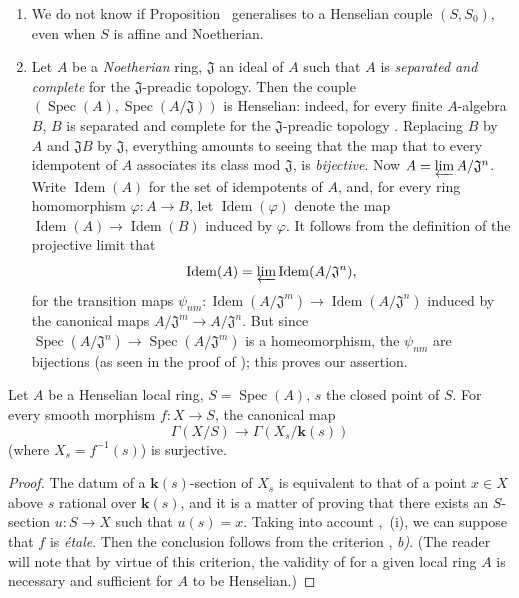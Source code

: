 \begin{remarks}[18.5.16]
\label{IV.18.5.16}
\begin{enumerate}
  \item[(i)] We do not know if Proposition~ generalises to a Henselian couple $(S,S_0)$, even when $S$ is affine and Noetherian.
  \item[(ii)] Let $A$ be a \emph{Noetherian} ring, $\mathfrak{J}$ an ideal of $A$ such that $A$ is \emph{separated and complete} for the $\mathfrak{J}$-preadic topology.
Then the couple $(\operatorname{Spec}(A),\operatorname{Spec}(A/\mathfrak{J}))$ is Henselian:
indeed, for every finite $A$-algebra $B$, $B$ is separated and complete for the $\mathfrak{J}$-preadic topology .
Replacing $B$ by $A$ and $\mathfrak{J}B$ by $\mathfrak{J}$, everything amounts to seeing that the map that to every idempotent of $A$ associates its class mod $\mathfrak{J}$, is \emph{bijective}.
Now $A=\varprojlim A/\mathfrak{J}^n$.
Write $\operatorname{Idem}(A)$ for the set of idempotents of $A$, and, for every ring homomorphism $\varphi:A\to B$, let $\operatorname{Idem}(\varphi)$ denote the map $\operatorname{Idem}(A)\to\operatorname{Idem}(B)$ induced by $\varphi$.
It follows from the definition of the projective limit that
\[
\operatorname{Idem}(A)=\varprojlim\operatorname{Idem}(A/\mathfrak{J}^n),
\]
for the transition maps $\psi_{nm}:\operatorname{Idem}(A/\mathfrak{J}^m)\to\operatorname{Idem}(A/\mathfrak{J}^n)$ induced by the canonical maps $A/\mathfrak{J}^m\to A/\mathfrak{J}^n$.
But since $\operatorname{Spec}(A/\mathfrak{J}^n)\to\operatorname{Spec}(A/\mathfrak{J}^m)$ is a homeomorphism, the $\psi_{nm}$ are bijections (as seen in the proof of );
this proves our assertion.
\end{enumerate}
\end{remarks}

\begin{theorem}[18.5.17]
\label{IV.18.5.17}
Let $A$ be a Henselian local ring, $S=\operatorname{Spec}(A)$, $s$ the closed point of $S$.
For every smooth morphism $f:X\to S$, the canonical map
\[
\Gamma(X/S)\to\Gamma(X_s/\boldsymbol{k}(s))
\]
\textup{(}where $X_s=f^{-1}(s)$\textup{)} is surjective.
\end{theorem}

\begin{proof}
The datum of a $\boldsymbol{k}(s)$-section of $X_s$ is equivalent to that of a point $x\in X$ above $s$ rational over $\boldsymbol{k}(s)$, and it is a matter of proving that there exists an $S$-section $u:S\to X$ such that $u(s)=x$.
Taking into account ,~(i), we can suppose that $f$ is \emph{\'etale}.
Then the conclusion follows from the criterion , \emph{b)}.
(The reader will note that by virtue of this criterion, the validity of  for a given local ring $A$ is necessary and sufficient for $A$ to be Henselian.)
\end{proof}

